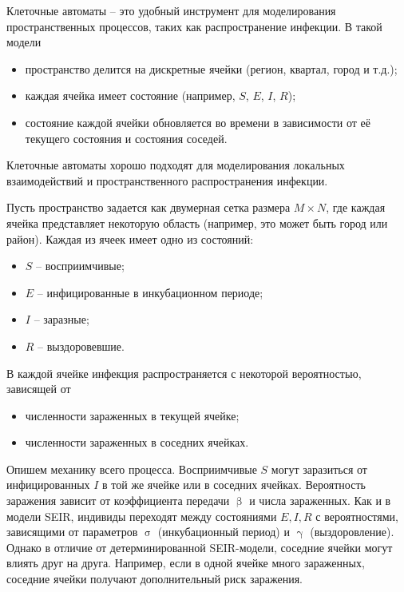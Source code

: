 \documentclass[a4paper, 14pt]{extreport}
\numberwithin{equation}{section}
\renewcommand{\beta}{\upbeta}
\renewcommand{\gamma}{\upgamma}
\renewcommand{\sigma}{\upsigma}
\begin{document}
	Клеточные автоматы -- это удобный инструмент для моделирования пространственных процессов, таких как распространение инфекции. В такой модели
	
	\begin{itemize}
		\item пространство делится на дискретные ячейки (регион, квартал, город и т.д.);
		\item каждая ячейка имеет состояние (например, $S$, $E$, $I$, $R$);
		\item состояние каждой ячейки обновляется во времени в зависимости от её текущего состояния и состояния соседей.
	\end{itemize}
	
	Клеточные автоматы хорошо подходят для моделирования локальных взаимодействий и пространственного распространения инфекции.
	
	Пусть пространство задается как двумерная сетка размера $M\times N$, где каждая ячейка представляет некоторую область (например, это может быть город или район).
	Каждая из ячеек имеет одно из состояний:
	\begin{itemize}
		\item $S$ -- восприимчивые;
		\item $E$ -- инфицированные в инкубационном периоде;
		\item $I$ -- заразные;
		\item $R$ -- выздоровевшие.
	\end{itemize}
	В каждой ячейке инфекция распространяется с некоторой вероятностью, зависящей от
	\begin{itemize}
		\item численности зараженных в текущей ячейке;
		\item численности зараженных в соседних ячейках.
	\end{itemize}
	Опишем механику всего процесса.
	Восприимчивые $S$ могут заразиться от инфицированных $I$ в той же ячейке или в соседних ячейках. Вероятность заражения зависит от коэффициента передачи $\beta$ и числа зараженных.
	Как и в модели SEIR, индивиды переходят между состояниями $E, I, R$ с вероятностями, зависящими от параметров $\sigma$ (инкубационный период) и $\gamma$ (выздоровление).
	Однако в отличие от детерминированной SEIR-модели, соседние ячейки могут влиять друг на друга. Например, если в одной ячейке много зараженных, соседние ячейки получают дополнительный риск заражения.
\end{document}
